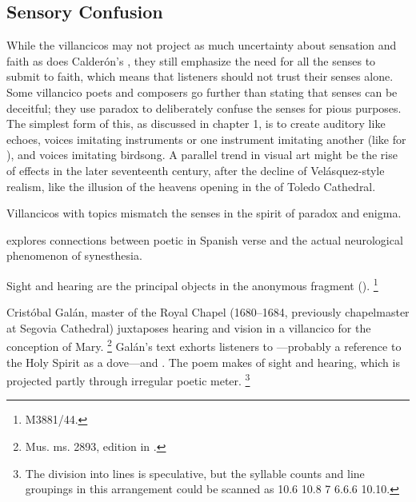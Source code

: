 \subsection{Sensory Confusion}

While the  villancicos may not project as much uncertainty about sensation and faith as does Calderón's , they still emphasize the need for all the senses to submit to faith, which means that listeners should not trust their senses alone.
Some villancico poets and composers go further than stating that senses can be deceitful; they use paradox to deliberately confuse the senses for pious purposes.
The simplest form of this, as discussed in chapter 1, is to create auditory  like echoes, voices imitating instruments or one instrument imitating another (like  for ), and voices imitating birdsong.
A parallel trend in visual art might be the rise of  effects in the later seventeenth century, after the decline of Velásquez-style realism, like the illusion of the heavens opening in the  of Toledo Cathedral.

Villancicos with  topics mismatch the senses in the spirit of paradox and enigma.%
  \begin{Footnote}
  \autocite{DoetschKraus:Sinestesia} explores connections between poetic  in Spanish verse and the actual neurological phenomenon of synesthesia.
  \end{Footnote}
Sight and hearing are the principal objects in the anonymous fragment  ().%
  \footnote{\signature{E-Mn}{M3881/44}.}

Cristóbal Galán, master of the Royal Chapel (1680--1684, previously chapelmaster at Segovia Cathedral) juxtaposes hearing and vision in a villancico for the conception of Mary.%
  \footnote{\signature{D-Mbs}{Mus. ms. 2893}, edition in \autocite[567--568]{CaberoPueyo:PhD}.}
Galán's text exhorts listeners to ---probably a reference to the Holy Spirit as a dove---and .
The poem makes  of sight and hearing, which is projected partly through irregular poetic meter.%
  \footnote{The division into lines is speculative, but the syllable counts and line groupings in this arrangement could be scanned as 10.6 10.8 7 6.6.6 10.10.}

